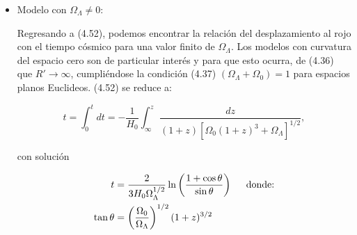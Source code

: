\documentclass[11pt]{article}
\begin{document}
{\begin{itemize}
\begin{itemize}
            \begin{equation}
	           t_0 = \frac{\Omega_0}{H_0(\Omega_0 - 1)^{3/2}} \left[ \sin^{-1} \left( \frac{ \Omega_0 - 1}{\Omega_0} \right)^{1/2} - \frac{{(\Omega_0 - 1)}^{1/2}}{\Omega_0 } \right].
            \end{equation}
            
            \item[-] $\Omega_0=1$:
            
            \begin{equation}
                t_0 = \frac{2}{3H_0}.
            \end{equation}

        \item[-] $\Omega_0<1$:
        
        \begin{equation}
       t_0 = \frac{\Omega_0}{H_0(1-\Omega_0)^{3/2}} \left[   \frac{(   1- \Omega_0)^{1/2}}{\Omega_0}  - \sinh^{-1} \left( \frac{{ 1-\Omega_0}}{\Omega_0 } \right)^{1/2} \right].
            \end{equation}
            
        \end{itemize}
        
        
        Los casos más útiles y simples son aquellos con $\Omega=1$, ec. (4.56); el caso de un Universo vacío tipo Milne, $\Omega_0 =0$ y la edad es $H_0^{-1}$; y el caso con $\Omega_0=2$, cuya edad calculada es $0.571 H_0^{-1}$. 
        
        \item Modelo con $\Omega_{\Lambda} \neq 0$:
        
        Regresando a (4.52), podemos encontrar la relación del desplazamiento al rojo con el tiempo cósmico para una valor finito de $\Omega_{\Lambda}$. Los modelos con curvatura del espacio cero son de particular interés y para que esto ocurra, de (4.36) que $R'\rightarrow{\infty}$, cumpliéndose la condición (4.37) $(\Omega_{\Lambda}  + \Omega_0) =1$ para espacios planos Euclideos. (4.52) se reduce a:
        
        \begin{equation}
             t = \int_0^t{dt} = - \frac{1}{H_0}\int_{\infty}^z{\frac{dz}{(1+z)[\Omega_0(1+z)^3+\Omega_{\Lambda}]^{1/2}}},
        \end{equation}
        
        con solución 
        
        \begin{align}
            t &= \frac{2}{3H_0\Omega_{\Lambda}^{1/2}} \ln \left(\frac{1+\cos \theta }{\sin \theta} \right)   \hspace{0.5cm} \text{donde:} \notag \\
            \tan \theta &= \left(\frac{\Omega_0}{\Omega_{\Lambda}} \right)^{1/2} (1+z)^{3/2}
        \end{align}
        

\end{itemize}}
\end{document}
